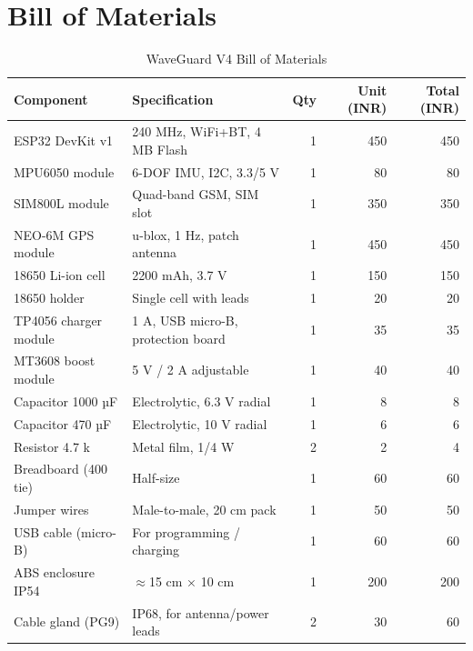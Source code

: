 \chapter{Bill of Materials}
\label{app:bom}

\begin{table}[H]
\centering
\caption{WaveGuard V4 Bill of Materials}
\label{tab:bom}
\begin{tabularx}{\textwidth}{l X r r r}
\toprule
\textbf{Component}    & \textbf{Specification}              & \textbf{Qty} & \textbf{Unit (INR)} & \textbf{Total (INR)} \\
\midrule
ESP32 DevKit v1       & 240 MHz, WiFi+BT, 4 MB Flash        & 1   & 450   & 450   \\
MPU6050 module        & 6-DOF IMU, I2C, 3.3/5 V             & 1   & 80    & 80    \\
SIM800L module        & Quad-band GSM, SIM slot             & 1   & 350   & 350   \\
NEO-6M GPS module     & u-blox, 1 Hz, patch antenna         & 1   & 450   & 450   \\
18650 Li-ion cell     & 2200 mAh, 3.7 V                     & 1   & 150   & 150   \\
18650 holder          & Single cell with leads              & 1   & 20    & 20    \\
TP4056 charger module & 1 A, USB micro-B, protection board  & 1   & 35    & 35    \\
MT3608 boost module   & 5 V / 2 A adjustable               & 1   & 40    & 40    \\
Capacitor 1000 µF     & Electrolytic, 6.3 V radial          & 1   & 8     & 8     \\
Capacitor 470 µF      & Electrolytic, 10 V radial           & 1   & 6     & 6     \\
Resistor 4.7 k        & Metal film, 1/4 W                   & 2   & 2     & 4     \\
Breadboard (400 tie)  & Half-size                           & 1   & 60    & 60    \\
Jumper wires          & Male-to-male, 20 cm pack            & 1   & 50    & 50    \\
USB cable (micro-B)   & For programming / charging          & 1   & 60    & 60    \\
ABS enclosure IP54    & $\approx$15 cm × 10 cm              & 1   & 200   & 200   \\
Cable gland (PG9)     & IP68, for antenna/power leads       & 2   & 30    & 60    \\

\end{tabularx}
\end{table}

